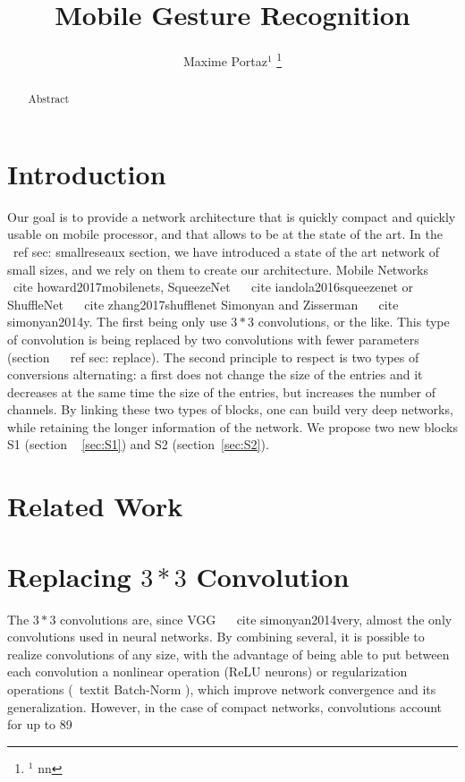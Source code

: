 \documentclass[letterpaper, 10 pt, conference]{ieeeconf}  %
\title{\LARGE \bf
Mobile Gesture Recognition
}
\author{Maxime Portaz$^{1}$%
\thanks{$^{1}$ nn }%

}
\begin{document}
\maketitle
\thispagestyle{empty}
\pagestyle{empty}


\begin{abstract}

Abstract

\end{abstract}


\section{Introduction}

Our goal is to provide a network architecture that is quickly compact and quickly usable on mobile processor, and that allows to be at the state of the art.
In the ~ \ ref {sec: smallreseaux} section, we have introduced a state of the art network of small sizes, and we rely on them to create our architecture.
Mobile Networks ~ \ cite {howard2017mobilenets}, SqueezeNet ~ \ cite {iandola2016squeezenet} or ShuffleNet ~ \ cite {zhang2017shufflenet} Simonyan and Zisserman ~ \ cite {simonyan2014y}.
The first being only use $ 3 * 3 $ convolutions, or the like.
This type of convolution is being replaced by two convolutions with fewer parameters (section ~ \ ref {sec: replace}).
The second principle to respect is two types of conversions alternating: a first does not change the size of the entries and it decreases at the same time the size of the entries, but increases the number of channels.
By linking these two types of blocks, one can build very deep networks, while retaining the longer information of the network.
We propose two new blocks S1 (section ~ \ref{sec:S1}) and S2 (section~\ref{sec:S2}).

\section{Related Work}


\section{Replacing $3*3$ Convolution}



The $ 3 * 3 $ convolutions are, since VGG ~ \ cite {simonyan2014very}, almost the only convolutions used in neural networks.
By combining several, it is possible to realize convolutions of any size, with the advantage of being able to put between each convolution a nonlinear operation (ReLU neurons) or regularization operations (\ textit {Batch-Norm} ), which improve network convergence and its generalization.
However, in the case of compact networks, convolutions account for up to 89%
\end{document}
